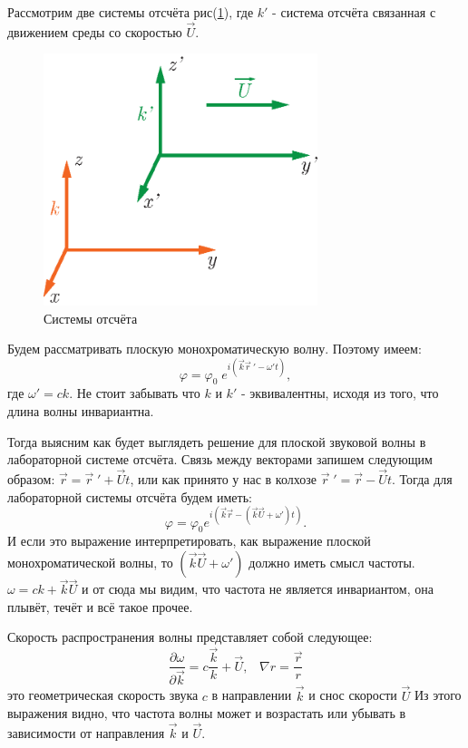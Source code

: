 \documentclass[14pt,a4paper,oneside]{extarticle}	%
\newcommand{\diff}[2] {\frac{\partial #1}{\partial #2} }
\begin{document}
Рассмотрим две системы отсчёта рис(\ref{fig::9}), где $ k' $ - система отсчёта связанная с движением среды со скоростью $ \vec{U} $.
\begin{figure}[h!] 	%
	\centering 		%
	\includegraphics[width=8cm]{9.eps} %
	\caption{Системы отсчёта}
	\label{fig::9}
\end{figure}
 
 Будем рассматривать плоскую монохроматическую волну. Поэтому имеем:
\begin{equation*}
\varphi = \varphi_{0}\;e^{i(\vec{k}\vec{r}\:'-\omega' t)}, 
\end{equation*}
где $ \omega' = ck $.  Не стоит забывать что $ k $ и $ k' $ - эквивалентны, исходя из того, что длина волны инвариантна.

Тогда выясним как будет выглядеть решение для плоской звуковой волны в лабораторной системе отсчёта.
Связь между векторами запишем следующим образом:
$ \vec{r} = \vec{r}\;'+  \vec{U}t $, или как принято у нас в колхозе $ \vec{r}\;' = \vec{r}  -  \vec{U}t $. Тогда для лабораторной системы отсчёта будем иметь:
\begin{equation*}
\varphi = \varphi_{0}e^{i(\vec{k}\vec{r}-(\vec{k}\vec{U}+\omega') t)}.
\end{equation*}
И если это выражение интерпретировать, как выражение плоской монохроматической волны, то $ (\vec{k}\vec{U}+\omega') $ должно иметь смысл частоты. $ \omega = ck + \vec{k}\vec{U} $ и от сюда мы видим, что частота не является инвариантом, она плывёт, течёт и всё такое прочее.

Скорость распространения волны представляет собой следующее:
\begin{equation*}
\diff{\omega}{\vec{k}} = c \frac{\vec{k}}{k} + \vec{U}, \;\;\;\nabla r = \frac{\vec{r}}{r}
\end{equation*}
это геометрическая скорость звука $ c $ в направлении $ \vec{k} $ и снос скорости $ \vec{U} $
Из этого выражения видно, что частота волны может и возрастать или убывать в зависимости от направления   $ \vec{k} $ и $ \vec{U} $.
\end{document}
